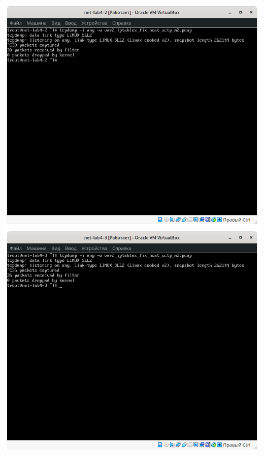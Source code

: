 \begin{center}
    \includegraphics[width=.49\textwidth]{screenshots/var2-iptables-fix-ncat-sctp-tcpdump2}
    \includegraphics[width=.49\textwidth]{screenshots/var2-iptables-fix-ncat-sctp-tcpdump3}
\end{center}
